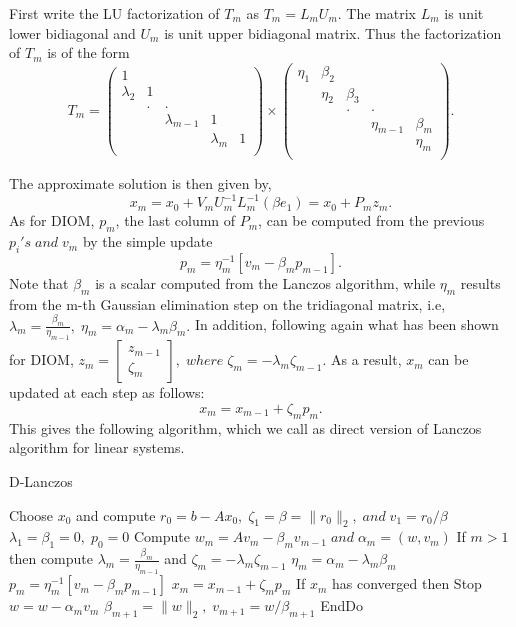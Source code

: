 \documentclass[10pt,a4paper]{article}
\begin{document}
First write the LU factorization of $T_m$ as $T_m=L_mU_m.$ The matrix $L_m$ is unit lower bidiagonal and $U_m$ is unit upper bidiagonal matrix. Thus the factorization of $T_m$ is of the form
$$
T_m = 
\left( \begin{array}{ccccc}
1 &  &  &  &  \\
\lambda_2 & 1 &  &  &  \\
 & . & . &  &  \\
 &  & \lambda_{m-1} & 1 &  \\
 &  &  & \lambda_m & 1 \\
\end{array} \right)\times 
\left( \begin{array}{ccccc}
\eta_1 & \beta_2 &  &  &  \\
 & \eta_2 & \beta_3 &  &  \\
 &  & . & . &  \\
 &  &  & \eta_{m-1} & \beta_m \\
 &  &  &  & \eta_m \\
\end{array} \right).
$$

The approximate solution is then given by,
$$x_m=x_0+V_mU^{-1}_mL^{-1}_m(\beta e_1) = x_0+P_mz_m.$$
As for DIOM, $p_m$, the last column of $P_m$, can be computed from the previous $p_i's\;and\;v_m$ by the simple update
$$p_m=\eta^{-1}_m[v_m-\beta_mp_{m-1}].$$
Note that $\beta_m$ is a scalar computed from the Lanczos algorithm, while $\eta_m$ results from the m-th Gaussian elimination step on the tridiagonal matrix, i.e, $\lambda_m=\frac{\beta_m}{\eta_{m-1}},\;\eta_m=\alpha_m-\lambda_m\beta_m.$ In addition, following again what has been shown for DIOM, $z_m=\left[ \begin{array}{c} z_{m-1} \\ \zeta_m \end{array} \right],\;where\;\zeta_m=-\lambda_m\zeta_{m-1}.$
As a result, $x_m$ can be updated at each step as follows:
$$x_m=x_{m-1}+\zeta_mp_m.$$
This gives the following algorithm, which we call as direct version of Lanczos algorithm for linear systems.

\begin{algorithm}
\caption{D-Lanczos}
\begin{algorithmic}[1]
\State Choose $x_0$ and compute $r_0=b-Ax_0,\;\zeta_1=\beta=\|r_0\|_2,\;and\;v_1=r_0/\beta$
\State $\lambda_1=\beta_1=0,\;p_0=0$
	\State Compute $w_m = Av_m-\beta_mv_{m-1}\;and\;\alpha_m=(w,v_m)$
	\State If $m > 1$ then compute $\lambda_m=\frac{\beta_m}{\eta_{m-1}}$ and $\zeta_m=-\lambda_m\zeta_{m-1}$
	\State $\eta_m=\alpha_m-\lambda_m\beta_m$
	\State $p_m = \eta^{-1}_m[v_m-\beta_mp_{m-1}]$
	\State $x_m=x_{m-1}+\zeta_mp_m$
	\State If $x_m$ has converged then Stop
	\State $w=w-\alpha_mv_m$
	\State $\beta_{m+1}=\|w\|_2,\;v_{m+1}=w/\beta_{m+1}$
\EndFor
\State EndDo
\end{algorithmic}
\end{algorithm}
\end{document}

